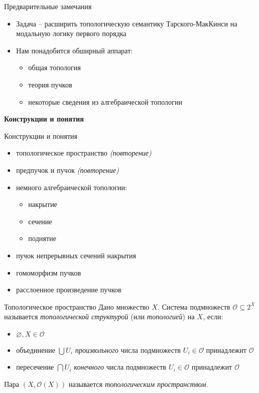 \documentclass{beamer}
\begin{document}
\begin{frame}{Предварительные замечания}
\begin{itemize}
	\item Задача -- расширить топологическую семантику Тарского-МакКинси на модальную логику первого порядка
	\medskip
	\item Нам понадобится обширный аппарат:
		\smallskip
		\begin{itemize}
			\item общая топология
			\item теория пучков
			\item некоторые сведения из алгебраической топологии
		\end{itemize}
\end{itemize}
\end{frame}



\begin{frame}{}
\begin{center}
	\textbf{Конструкции и понятия}
\end{center}
\end{frame}

\begin{frame}{Конструкции и понятия}
\begin{itemize}
	\item топологическое пространство {\small \textit{(повторение)}}
	\item предпучок и пучок {\small \textit{(повторение)}}
	\item немного алгебраической топологии:
		\begin{itemize}
			\item накрытие
			\item сечение
			\item поднятие
		\end{itemize}
	\item пучок непрерывных сечений накрытия
	\item гомоморфизм пучков
	\item расслоенное произведение пучков
\end{itemize}
\end{frame}

\begin{frame}{Топологическое пространство}
Дано множество $X$. Система подмножеств $\mathcal{O} \subseteq 2^X$ называется \textit{топологической структурой} (или \textit{топологией}) на $X$, если:\\
\bigskip
\begin{itemize}
	\item $\varnothing, X \in \mathcal{O}$
	\item объединение $\bigcup U_i$ \textit{произвольного} числа подмножеств $U_i \in \mathcal{O}$ принадлежит $\mathcal{O}$
	\item пересечение $\bigcap U_i$ \textit{конечного} числа подмножеств $U_i \in \mathcal{O}$ принадлежит $\mathcal{O}$
\end{itemize}
\bigskip
Пара $(X, \mathcal{O}(X))$ называется \textit{топологическим пространством}.
\end{frame}
\end{document}
